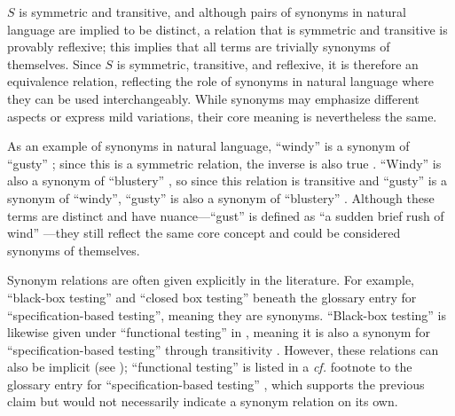 $S$ is symmetric and transitive, and although pairs of
synonyms in natural language are implied to be distinct, a relation that is
symmetric and transitive is provably reflexive; this implies that all terms are
trivially synonyms of themselves. Since $S$ is symmetric, transitive, and
reflexive, it is therefore an equivalence relation, reflecting the role of
synonyms in natural language where they can be used interchangeably. While
synonyms may emphasize different aspects or express mild variations, their core
meaning is nevertheless the same.

As an example of synonyms in natural language, ``windy'' is a synonym of
``gusty'' \citep{WindySyns}; since this is a symmetric relation, the inverse is
also true \citeyearpar{GustySyns}. ``Windy'' is also a synonym of ``blustery''
\citeyearpar{WindySyns}, so since this relation is transitive and ``gusty'' is
a synonym of ``windy'', ``gusty'' is also a synonym of ``blustery''
\citeyearpar{GustySyns}. Although these terms are distinct
\citeyearpar{GustySyns,WindySyns} and have nuance---``gust'' is defined as ``a
sudden brief rush of wind'' \citeyearpar{GustDef}---they still reflect the
same core concept and could be considered synonyms of themselves.

Synonym relations are often given explicitly in the literature. For example,
\citet[p.~9]{IEEE2022}  ``black-box testing'' and
``closed box testing'' beneath the glossary entry for ``specification-based
testing'', meaning they are synonyms. ``Black-box testing'' is likewise given
under ``functional testing'' in \citeyearpar[p.~196]{IEEE2017}, meaning it is
also a synonym for ``specification-based testing'' through transitivity%
.
However, these relations can also be implicit (see );
``functional testing'' is listed in a \emph{cf.} footnote to the glossary entry
for ``specification-based testing'' \citeyearpar[p.~431]{IEEE2017}, which
supports the previous claim but would not necessarily indicate a synonym
relation on its own.

